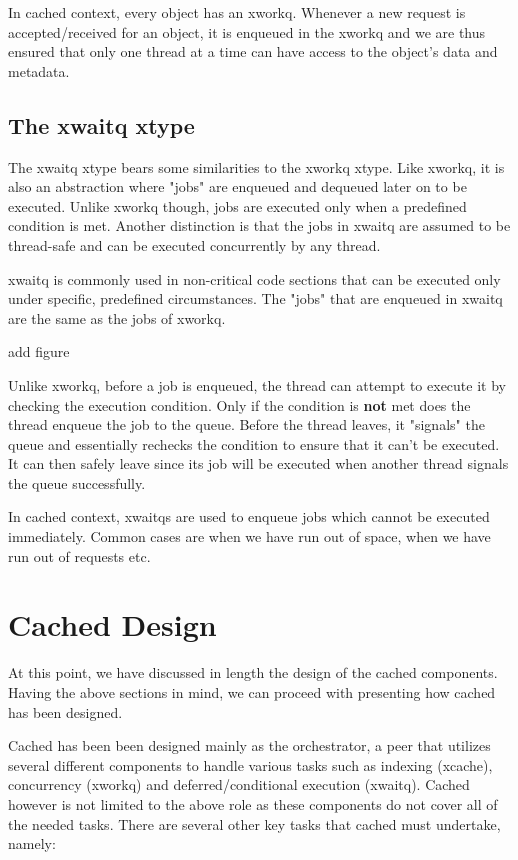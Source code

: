 In cached context, every object has an xworkq. Whenever a new request is 
accepted/received for an object, it is enqueued in the xworkq and we are thus 
ensured that only one thread at a time can have access to the object's data and 
metadata.

\subsection{The xwaitq xtype}\label{sec:xwaitq-design}

The xwaitq xtype bears some similarities to the xworkq xtype. Like xworkq, it 
is also an abstraction where "jobs" are enqueued and dequeued later on to be 
executed. Unlike xworkq though, jobs are executed only when a predefined 
condition is met. Another distinction is that the jobs in xwaitq are assumed to 
be thread-safe and can be executed concurrently by any thread.  

xwaitq is commonly used in non-critical code sections that can be executed only 
under specific, predefined circumstances. The "jobs" that are enqueued in 
xwaitq are the same as the jobs of xworkq.

\fixme add figure

Unlike xworkq, before a job is enqueued, the thread can attempt to execute it 
by checking the execution condition. Only if the condition is \textbf{not} met 
does the thread enqueue the job to the queue. Before the thread leaves, it 
"signals" the queue and essentially rechecks the condition to ensure that it 
can't be executed. It can then safely leave since its job will be executed when 
another thread signals the queue successfully.

In cached context, xwaitqs are used to enqueue jobs which cannot be executed 
immediately. Common cases are when we have run out of space, when we have run 
out of requests etc.

\section{Cached Design}\label{sec:cached-design}

At this point, we have discussed in length the design of the cached components.  
Having the above sections in mind, we can proceed with presenting how cached 
has been designed.

Cached has been been designed mainly as the orchestrator, a peer that utilizes 
several different components to handle various tasks such as indexing (xcache), 
concurrency (xworkq) and deferred/conditional execution (xwaitq). Cached 
however is not limited to the above role as these components do not cover all 
of the needed tasks. There are several other key tasks that cached must 
undertake, namely:


